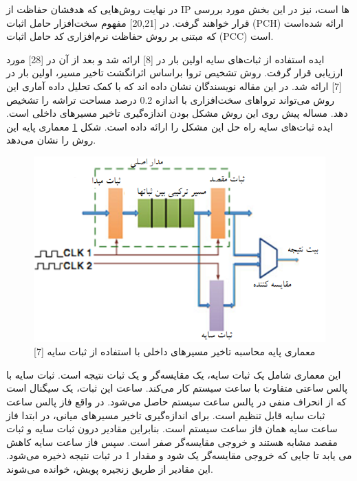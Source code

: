 در نهایت روش‌هایی که هدفشان حفاظت از IP ها است، نیز در این بخش مورد بررسی قرار خواهند گرفت. در [20,21] مفهوم سخت‌افزار حامل اثبات  (PCH) ارائه شده‌است که مبتنی بر روش حفاظت نرم‌افزاری کد حامل اثبات (PCC) است.


ایده استفاده از ثبات‌های سایه اولین بار در [8] ارائه شد و بعد از آن در [28]  مورد ارزیابی قرار گرفت. روش تشخیص تروا  براساس اثرانگشت تاخیر مسیر، اولین بار در [7] ارائه شد. در این مقاله نویسندگان نشان داده اند که با کمک تحلیل داده آماری این روش می‌تواند تروا‌های سخت‌افزاری با اندازه 0.2 درصد مساحت تراشه را تشخیص دهد.  مساله پیش روی این روش مشکل بودن اندازه‌گیری تاخیر مسیرهای داخلی است.  ایده ثبات‌های سایه راه حل این مشکل را ارائه داده است. شکل \ref{fig1-5} معماری پایه این روش را نشان می‌دهد.

 \begin{figure}
\begin{center}
\includegraphics[scale=1]{figs/fig1-5.png}
\caption{معماری پایه محاسبه تاخیر مسیرهای داخلی با استفاده از ثبات سایه [7]}
\label{fig1-5}
\end{center}
\end{figure} 
 
این معماری شامل یک ثبات سایه، یک مقایسه‌گر و یک ثبات نتیجه است. ثبات سایه با پالس ساعتی متفاوت با ساعت سیستم کار می‌کند. ساعت این ثبات، یک سیگنال است که از انحراف منفی در پالس ساعت سیستم حاصل می‌شود. در واقع فاز پالس ساعت ثبات سایه قابل تنظیم است. برای اندازه‌گیری تاخیر مسیرهای میانی، در ابتدا فاز ساعت سایه همان فاز ساعت سیستم است. بنابراین مقادیر درون ثبات سایه و ثبات مقصد مشابه هستند و خروجی مقایسه‌گر صفر است. سپس فاز ساعت سایه کاهش می یابد تا جایی که خروجی مقایسه‌گر یک شود و مقدار 1 در ثبات نتیجه ذخیره می‌شود. این مقادیر از طریق زنجیره پویش، خوانده می‌شوند.

